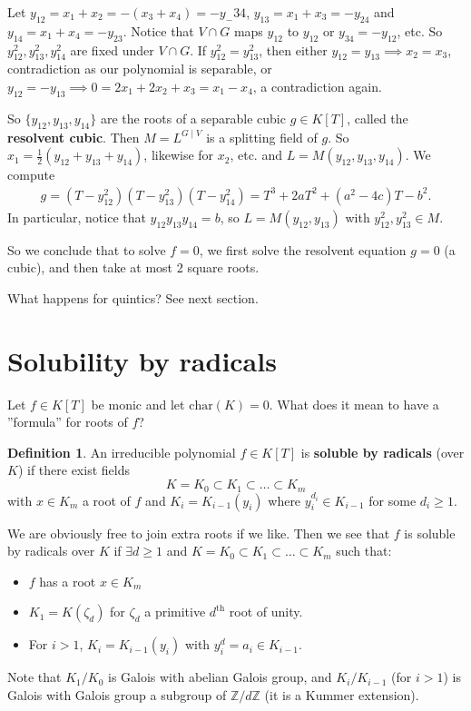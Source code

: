\documentclass{article}
\theoremstyle{definition}
\newtheorem{defn}{Definition}[section]
\begin{document}
Let $y_{12}= x_1+x_2=-(x_3+x_4)=-y_-34$, $y_{13}=x_1+x_3=-y_{24}$ and $y_{14}=x_1+x_4=-y_{23}$. Notice that $V \cap G$ maps $y_{12}$ to $y_{12}$ or $y_{34} = -y_{12}$, etc. So $y_{12}^2, y_{13}^2, y_{14}^2$ are fixed under $V \cap G$. If $y_{12}^2=y_{13}^2$, then either $y_{12}=y_{13} \implies x_2=x_3$, contradiction as our polynomial is separable, or $y_{12}=-y_{13} \implies 0=2x_1+2x_2+x_3=x_1-x_4$, a contradiction again.
\vspace{1mm}

So $\{y_{12},y_{13},y_{14}\}$ are the roots of a separable cubic $g \in K[T]$, called the \textbf{resolvent cubic}. Then $M=L^{G \mid V}$ is a splitting field of $g$. So $x_1 = \frac{1}{2}(y_{12}+y_{13}+y_{14})$, likewise for $x_2$, etc. and $L=M(y_{12},y_{13},y_{14})$. We compute 
\begin{align*}
    g = (T-y_{12}^2)(T-y_{13}^2)(T-y_{14}^2) = T^3 + 2aT^2 + (a^2-4c) T -b^2.
\end{align*}
In particular, notice that $y_{12}y_{13}y_{14}=b$, so $L=M(y_{12},y_{13})$ with $y_{12}^2, y_{13}^2 \in M$.
\vspace{1mm}

So we conclude that to solve $f=0$, we first solve the resolvent equation $g=0$ (a cubic), and then take at most 2 square roots.
\vspace{1mm}

What happens for quintics? See next section.

\section{Solubility by radicals}
Let $f \in K[T]$ be monic and let $\text{char}(K)=0$. What does it mean to have a ''formula'' for roots of $f$?
\begin{defn}
    An irreducible polynomial $f \in K[T]$ is \textbf{soluble by radicals} (over $K$) if there exist fields \[
    K = K_0 \subset K_1 \subset \ldots \subset K_m
    \] with $x \in K_m$ a root of $f$ and $K_i = K_{i-1}(y_i)$ where $y_i^{d_i} \in K_{i-1}$ for some $d_i\ge 1$.
\end{defn}
We are obviously free to join extra roots if we like. Then we see that $f$ is soluble by radicals over $K$ if $\exists d\ge 1$ and $K = K_0 \subset K_1 \subset \ldots \subset K_m$ such that:
\begin{itemize}
    \item $f$ has a root $x \in K_m$
    \item $K_1 = K(\zeta_d)$ for $\zeta_d$ a primitive $d^{\text{th}}$ root of unity.
    \item For $i>1$, $K_i=K_{i-1}(y_i)$ with $y_i^d = a_i \in K_{i-1}$.
\end{itemize}
Note that $K_1/K_0$ is Galois with abelian Galois group, and $K_i/K_{i-1}$ (for $i>1$) is Galois with Galois group a subgroup of $\mathbb{Z}/d\mathbb{Z}$ (it is a Kummer extension).
\vspace{1mm}
\end{document}
